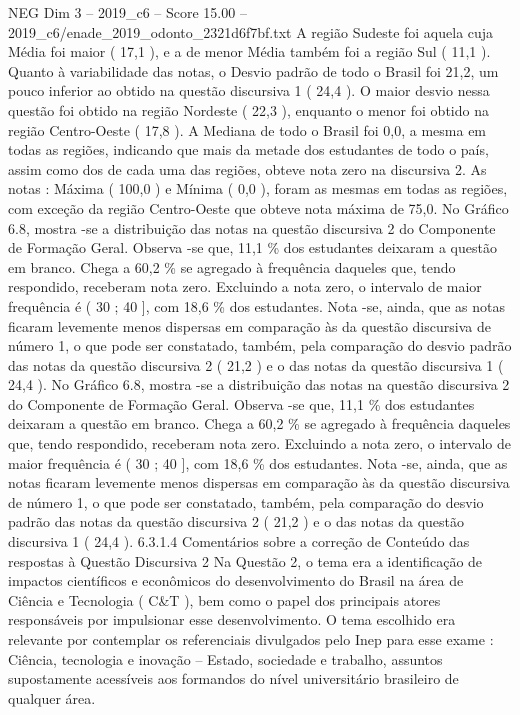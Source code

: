 \begin{textsample}{NEG Dim 3 – 2019\_c6 – Score 15.00 – 2019\_c6/enade\_2019\_odonto\_2321d6f7bf.txt}
A região Sudeste foi aquela cuja Média foi maior ( 17,1 ), e a de menor Média também foi a região Sul ( 11,1 ).
Quanto à variabilidade das notas, o Desvio padrão de todo o Brasil foi 21,2, um pouco inferior ao obtido na questão discursiva 1 ( 24,4 ).
O maior desvio nessa questão foi obtido na região Nordeste ( 22,3 ), enquanto o menor foi obtido na região Centro-Oeste ( 17,8 ).
A Mediana de todo o Brasil foi 0,0, a mesma em todas as regiões, indicando que mais da metade dos estudantes de todo o país, assim como dos de cada uma das regiões, obteve nota zero na discursiva 2.
As notas : Máxima ( 100,0 ) e Mínima ( 0,0 ), foram as mesmas em todas as regiões, com exceção da região Centro-Oeste que obteve nota máxima de 75,0.
No Gráfico 6.8, mostra -se a distribuição das notas na questão discursiva 2 do Componente de Formação Geral.
Observa -se que, 11,1 \% dos estudantes deixaram a questão em branco.
Chega a 60,2 \% se agregado à frequência daqueles que, tendo respondido, receberam nota zero.
Excluindo a nota zero, o intervalo de maior frequência é ( 30 ; 40 ], com 18,6 \% dos estudantes.
Nota -se, ainda, que as notas ficaram levemente menos dispersas em comparação às da questão discursiva de número 1, o que pode ser constatado, também, pela comparação do desvio padrão das notas da questão discursiva 2 ( 21,2 ) e o das notas da questão discursiva 1 ( 24,4 ).
No Gráfico 6.8, mostra -se a distribuição das notas na questão discursiva 2 do Componente de Formação Geral.
Observa -se que, 11,1 \% dos estudantes deixaram a questão em branco.
Chega a 60,2 \% se agregado à frequência daqueles que, tendo respondido, receberam nota zero.
Excluindo a nota zero, o intervalo de maior frequência é ( 30 ; 40 ], com 18,6 \% dos estudantes.
Nota -se, ainda, que as notas ficaram levemente menos dispersas em comparação às da questão discursiva de número 1, o que pode ser constatado, também, pela comparação do desvio padrão das notas da questão discursiva 2 ( 21,2 ) e o das notas da questão discursiva 1 ( 24,4 ). 6.3.1.4 Comentários sobre a correção de Conteúdo das respostas à Questão Discursiva 2 Na Questão 2, o tema era a identificação de impactos científicos e econômicos do desenvolvimento do Brasil na área de Ciência e Tecnologia ( C\&T ), bem como o papel dos principais atores responsáveis por impulsionar esse desenvolvimento.
O tema escolhido era relevante por contemplar os referenciais divulgados pelo Inep para esse exame : Ciência, tecnologia e inovação – Estado, sociedade e trabalho, assuntos supostamente acessíveis aos formandos do nível universitário brasileiro de qualquer área.

\end{textsample}
